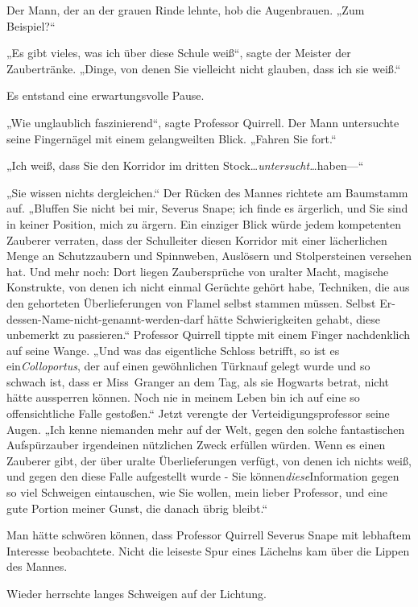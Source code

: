 {Der Mann, der an der grauen Rinde lehnte, hob die Augenbrauen. „Zum Beispiel?“

„Es gibt vieles, was ich über diese Schule weiß“, sagte der Meister der Zaubertränke. „Dinge, von denen Sie vielleicht nicht glauben, dass ich sie weiß.“

Es entstand eine erwartungsvolle Pause.

„Wie unglaublich faszinierend“, sagte Professor Quirrell. Der Mann untersuchte seine Fingernägel mit einem gelangweilten Blick. „Fahren Sie fort.“

„Ich weiß, dass Sie den Korridor im dritten Stock…\emph{untersucht…}haben—“

„Sie wissen nichts dergleichen.“ Der Rücken des Mannes richtete am Baumstamm auf. „Bluffen Sie nicht bei mir, Severus Snape; ich finde es ärgerlich, und Sie sind in keiner Position, mich zu ärgern. Ein einziger Blick würde jedem kompetenten Zauberer verraten, dass der Schulleiter diesen Korridor mit einer lächerlichen Menge an Schutzzaubern und Spinnweben, Auslösern und Stolpersteinen versehen hat. Und mehr noch: Dort liegen Zaubersprüche von uralter Macht, magische Konstrukte, von denen ich nicht einmal Gerüchte gehört habe, Techniken, die aus den gehorteten Überlieferungen von Flamel selbst stammen müssen. Selbst Er-dessen-Name-nicht-genannt-werden-darf hätte Schwierigkeiten gehabt, diese unbemerkt zu passieren.“ Professor Quirrell tippte mit einem Finger nachdenklich auf seine Wange. „Und was das eigentliche Schloss betrifft, so ist es ein\emph{Colloportus}, der auf einen gewöhnlichen Türknauf gelegt wurde und so schwach ist, dass er Miss~Granger an dem Tag, als sie Hogwarts betrat, nicht hätte aussperren können. Noch nie in meinem Leben bin ich auf eine so offensichtliche Falle gestoßen.“ Jetzt verengte der Verteidigungsprofessor seine Augen. „Ich kenne niemanden mehr auf der Welt, gegen den solche fantastischen Aufspürzauber irgendeinen nützlichen Zweck erfüllen würden. Wenn es einen Zauberer gibt, der über uralte Überlieferungen verfügt, von denen ich nichts weiß, und gegen den diese Falle aufgestellt wurde - Sie können\emph{diese}Information gegen so viel Schweigen eintauschen, wie Sie wollen, mein lieber Professor, und eine gute Portion meiner Gunst, die danach übrig bleibt.“

Man hätte schwören können, dass Professor Quirrell Severus Snape mit lebhaftem Interesse beobachtete. Nicht die leiseste Spur eines Lächelns kam über die Lippen des Mannes.

Wieder herrschte langes Schweigen auf der Lichtung.

}
